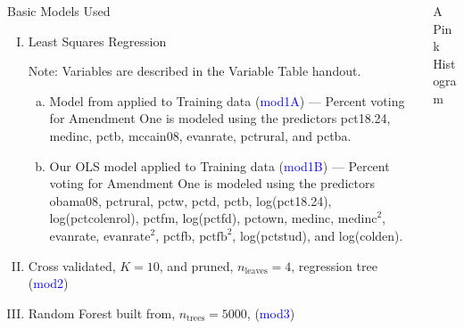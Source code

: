 \documentclass[final]{beamer}\usepackage[]{graphicx}\usepackage[]{color}
\newenvironment{knitrout}{}{} %
\begin{document}
\begin{frame}[fragile]
\begin{columns}[t]
\begin{column}{0.31\linewidth}
\begin{minipage}[t][.955\textheight]{\linewidth}
\begin{block}{Basic Models Used}

\begin{enumerate}[I.]
\item Least Squares Regression
\vspace{0ex}

Note: Variables are described in the Variable Table handout.
\begin{enumerate}[a.]
\item Model from \cite{DE12} applied to Training data (\textcolor{blue}{mod1A}) --- Percent voting for Amendment One is modeled using the predictors pct18.24, medinc, pctb, mccain08, evanrate, pctrural, and pctba. 
\item Our OLS model applied to Training data (\textcolor{blue}{mod1B}) --- Percent voting for Amendment One is modeled using the predictors obama08, pctrural, pctw, pctd, pctb, log(pct18.24), log(pctcolenrol), pctfm, log(pctfd), pctown,  medinc, $\text{medinc}^2$, evanrate, $\text{evanrate}^2$, pctfb, $\text{pctfb}^2$, log(pctstud), and log(colden).
\end{enumerate}
\item Cross validated, $K = 10$, and pruned, $n_{\text{leaves}}=4$, regression tree \cite{JF09} (\textcolor{blue}{mod2})
\item Random Forest built from, $n_{\text{trees}} = 5000 $, \cite{AL02} (\textcolor{blue}{mod3})
\end{enumerate}
\vspace{0ex}

\end{block}
\vfill

\end{minipage}
\end{column}%


\begin{column}{0.31\linewidth}
\begin{minipage}[t][.955\textheight]{\linewidth} 

\vspace{0ex}
\begin{block}{A Pink Histogram}
\vspace{0ex}
\begin{knitrout}
\color{fgcolor}


\end{knitrout}
\end{block}
\end{minipage}
\end{column}
\end{columns}
\end{frame}
\end{document}
